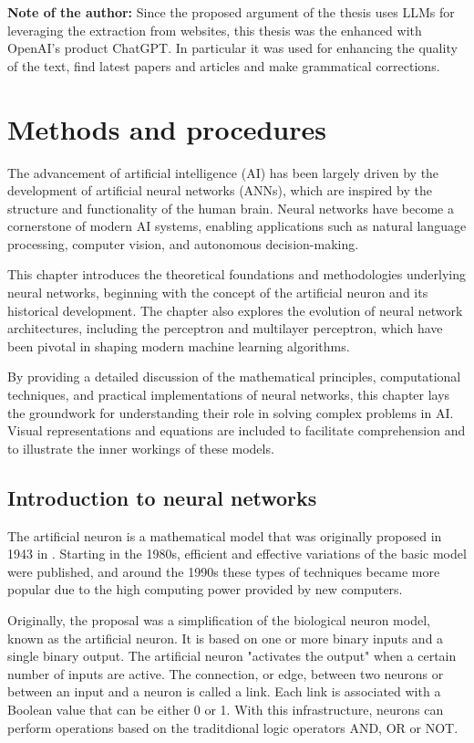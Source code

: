 \textbf{Note of the author:} Since the proposed argument of the thesis uses LLMs for leveraging the extraction from websites, this thesis was the enhanced with OpenAI's product ChatGPT. In particular it was used for enhancing the quality of the text, find latest papers and articles and make grammatical corrections. 

\chapter{Methods and procedures}
The advancement of artificial intelligence (AI) has been largely driven by the development of artificial neural networks (ANNs), which are inspired by the structure and functionality of the human brain. Neural networks have become a cornerstone of modern AI systems, enabling applications such as natural language processing, computer vision, and autonomous decision-making.

This chapter introduces the theoretical foundations and methodologies underlying neural networks, beginning with the concept of the artificial neuron and its historical development. The chapter also explores the evolution of neural network architectures, including the perceptron and multilayer perceptron, which have been pivotal in shaping modern machine learning algorithms.

By providing a detailed discussion of the mathematical principles, computational techniques, and practical implementations of neural networks, this chapter lays the groundwork for understanding their role in solving complex problems in AI. Visual representations and equations are included to facilitate comprehension and to illustrate the inner workings of these models.

\section{Introduction to neural networks}
The artificial neuron is a mathematical model that was originally proposed in 1943 in \autocite{22}.
Starting in the 1980s, efficient and effective variations of the basic model were published, and around the 1990s these types of techniques became more popular due to the high computing power provided by new computers.

Originally, the proposal was a simplification of the biological neuron model, known as the artificial neuron. It is based on one or more binary inputs and a single binary output. The artificial neuron "activates the output" when a certain number of inputs are active. The connection, or edge, between two neurons or between an input and a neuron is called a link. Each link is associated with a Boolean value that can be either 0 or 1. With this infrastructure, neurons can perform operations based on the traditdional logic operators AND, OR or NOT.

